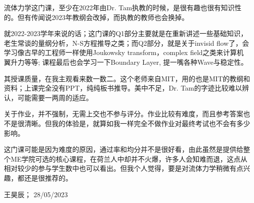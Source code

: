 流体力学这门课，至少在2022年由Dr. Tam执教的时候，是很有趣也很有知识性的。但有传闻说2023年教纲会改掉，而执教的教师也会换掉。

就2022-2023学年来说的话；这门课的Q1部分主要就是在重新讲述一些基础知识，老生常谈的量纲分析，N-S方程推导之类；而Q2部分，就是关于invisid flow了，会学习像古早的工程师一样使用Joukowsky transform，complex field之类来计算机翼升力等等; 课程最后也会学习一下Boundary Layer, 提一嘴各种Wave与稳定性。

其授课质量，在我主观看来数一数二。这个老师来自MIT，用的也是MIT的教纲和资料；上课完全没有PPT，纯纯板书推导。美中不足，Dr. Tam的字迹比较难以辨认，可能需要一两周的适应。

关于作业，并不强制，无需上交也不参与评分。作业比较有难度，而且参考答案也不是很清晰。但我的体验是，就算如我一样完全不做作业对最终考试也不会有多少影响。

这门课可能是因为难度的原因，通过率和均分并不是很好看，由此虽然是提供给整个ME学院可选的核心课程，在荷兰人中却并不火爆，许多人会知难而退，这点从相对较少的参与学生数中也可以看出。但我个人觉得，要是对流体力学稍微有点兴趣，都还是很推荐的。

\begin{flushright}
王昊辰； 28/05/2023
\end{flushright}




